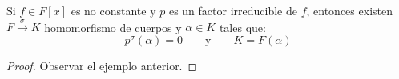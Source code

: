 \begin{lema}\label{lema:cuerpo_descomposicion}
    Si $f\in F[x]$ es no constante y $p$ es un factor irreducible de $f$, entonces existen $F\stackrel{\sigma}{\to}K$ homomorfismo de cuerpos y $\alpha\in K$ tales que:
    \begin{equation*}
        p^\sigma(\alpha) = 0 \qquad \text{y}\qquad  K = F(\alpha)
    \end{equation*}
    \begin{proof}
        Observar el ejemplo anterior.
    \end{proof}
\end{lema}

